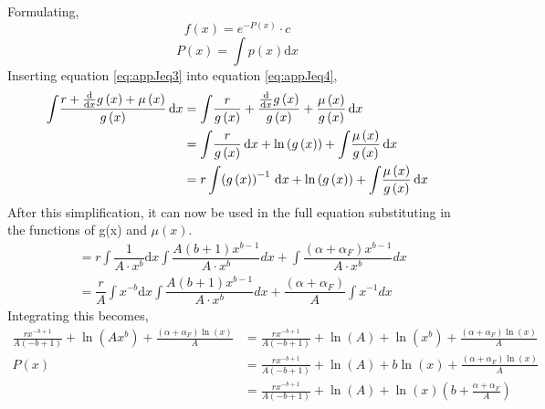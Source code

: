 \documentclass{article}
\numberwithin{equation}{section} %
\begin{document}
Formulating,
\begin{equation}\label{eq:appJfx}
    f(x) = e^{-P(x)}\cdot c
\end{equation}
\begin{equation}\label{eq:appJeq4}
    P(x)=\int p(x)\mathrm{d}x
\end{equation}
Inserting equation \ref{eq:appJeq3} into equation \ref{eq:appJeq4},
\begin{equation}
\begin{aligned}
    \int \!{\frac {r+{\frac {\rm d}{{\rm d}x}}g \left( x \right) +\mu
 \left( x \right) }{g \left( x \right) }}\,{\rm d}x &=\int \!{\frac {r}{g \left( x \right) }}+{\frac {{\frac {\rm d}{{\rm d}
x}}g \left( x \right) }{g \left( x \right) }}+{\frac {\mu \left( x
 \right) }{g \left( x \right) }}\,{\rm d}x\\
 &=\int \!{\frac {r}{g \left( x \right) }}\,{\rm d}x+\ln  \left( g
 \left( x \right)  \right) +\int \!{\frac {\mu \left( x \right) }{g
 \left( x \right) }}\,{\rm d}x\\
 &=r\int \! \left( g \left( x \right)  \right) ^{-1}\,{\rm d}x+\ln 
 \left( g \left( x \right)  \right) +\int \!{\frac {\mu \left( x
 \right) }{g \left( x \right) }}\,{\rm d}x\\
\end{aligned}
\end{equation}
After this simplification, it can now be used in the full equation substituting in the functions of g(x) and $\mu(x)$.
\begin{equation}
\begin{aligned}
&= r\int\dfrac{1}{A\cdot x^{b}}\mathrm{d}x\int\dfrac{A(b+1)x^{b-1}}{A\cdot x^{b}}dx+\int\dfrac{(\alpha+\alpha_{F})x^{b-1}}{A\cdot x^{b}} dx\\
&=\dfrac{r}{A} \int x^{-b}\mathrm{d}x\int\dfrac{A(b+1)x^{b-1}}{A\cdot x^{b}}dx+\dfrac{(\alpha+\alpha_{F})}{A}\int x^{-1} dx
\end{aligned}
\end{equation}
Integrating this becomes,
\begin{equation}\label{eq:appJeq5}
\begin{aligned}
    {\frac {r{x}^{-b+1}}{A \left( -b+1 \right) }}+\ln  \left( A{x}^{b}
 \right) +{\frac { \left( \alpha+\alpha_{F} \right) \ln  \left( x
 \right) }{A}} &= {\frac {r{x}^{-b+1}}{A \left( -b+1 \right) }}+\ln  \left( A \right) +
\ln  \left( {x}^{b} \right) +{\frac { \left( \alpha+\alpha_{F}
 \right) \ln  \left( x \right) }{A}}\\
P(x) &={\frac {r{x}^{-b+1}}{A \left( -b+1 \right) }}+\ln  \left( A \right) +b
\ln  \left( x \right) +{\frac { \left( \alpha+\alpha_{F} \right) \ln 
 \left( x \right) }{A}}\\
 &={\frac {r{x}^{-b+1}}{A \left( -b+1 \right) }}+\ln  \left( A \right) +
\ln  \left( x \right)  \left( b+{\frac {\alpha+\alpha_{F}}{A}}
 \right) 
\end{aligned}
\end{equation}
\end{document}
